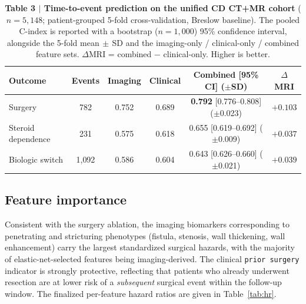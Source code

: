\documentclass[11pt]{article}
\begin{document}
\begin{table}[htbp]
\centering
\caption{\textbf{Table 3 $\vert$ Time-to-event prediction on the unified CD CT+MR cohort}
($n=5{,}148$; patient-grouped 5-fold cross-validation, Breslow baseline). The pooled C-index is
reported with a bootstrap ($n=1{,}000$) 95\% confidence interval, alongside the 5-fold
mean$\,\pm\,$SD and the imaging-only / clinical-only / combined feature sets. $\Delta$MRI = combined
$-$ clinical-only. Higher is better.}
\label{tab:survival}
\small
\begin{tabular}{@{}lccccc@{}}
\toprule
\textbf{Outcome} & \textbf{Events} & \textbf{Imaging} & \textbf{Clinical} &
\textbf{Combined [95\% CI] ($\pm$SD)} & \textbf{$\Delta$MRI} \\
\midrule
Surgery            & 782   & 0.752 & 0.689 & \textbf{0.792} [0.776--0.808] ($\pm$0.023) & $+0.103$ \\
Steroid dependence & 231   & 0.575 & 0.618 & 0.655 [0.619--0.692] ($\pm$0.009)         & $+0.037$ \\
Biologic switch    & 1{,}092 & 0.586 & 0.604 & 0.643 [0.626--0.660] ($\pm$0.021)      & $+0.039$ \\
\bottomrule
\end{tabular}
\end{table}

\subsection*{Feature importance}

Consistent with the surgery ablation, the imaging biomarkers corresponding to penetrating and
stricturing phenotypes (fistula, stenosis, wall thickening, wall enhancement) carry the largest
standardized surgical hazards, with the majority of elastic-net-selected features being imaging-derived.
The clinical \texttt{prior surgery} indicator is strongly protective, reflecting that patients who
already underwent resection are at lower risk of a \emph{subsequent} surgical event within the
follow-up window.
The finalized per-feature hazard ratios are given in Table~\ref{tab:hr}.
\end{document}
